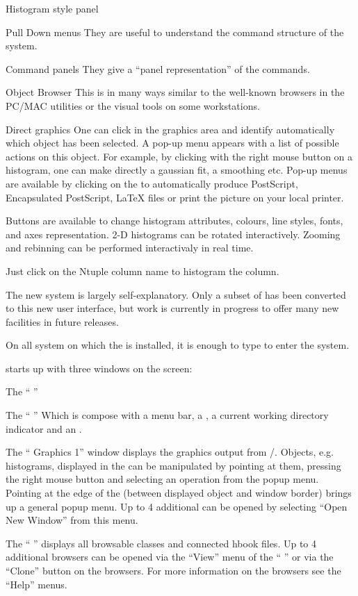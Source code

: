 \begin{DL}{Histogram style panel}
\item[Pull Down menus] They are useful to understand the command structure of
      the \XPAW{} system.
\item[Command panels] They give a ``panel representation'' of the commands.
\item[Object Browser] This is in many ways similar to the well-known browsers
      in the PC/MAC utilities or the visual tools on some workstations.
\item[Direct graphics] One can click in the graphics area and identify
      automatically which object has been selected. A pop-up menu appears
      with a list of possible actions on this object. For example, by clicking
      with the right mouse button on a histogram, one can make directly a
      gaussian fit, a smoothing etc.
      Pop-up menus are available by clicking on the \GW{} to
      automatically produce PostScript, Encapsulated PostScript, \LaTeX{} files
      or print the picture on your local printer.
\item[\HSP] Buttons are available to change
      histogram attributes, colours, line styles, fonts, and
      axes representation.
      2-D histograms can be rotated interactively. Zooming and rebinning can
      be performed interactivaly in real time.
\item[\NV] Just click on the Ntuple column name to histogram
      the column.
\end{DL}

The new system is largely self-explanatory. Only a subset of \XPAW{} has been
converted to this new user interface, but work is currently in progress to
offer many new facilities in future releases.

On all system on which the \CERNLIB{} is installed, it is enough to
type  to enter the system.

\PAWPP{} starts up with three windows on the screen:

\begin{DL}{The ``\PAWPP{} \EW''}
\item[The ``\PAWPP{} \EW'']
   Which is compose with a menu bar, a \TP, a current working
   directory indicator and an \IP.

\item[The ``\PAWPP{} Graphics 1'']
   window displays the graphics output from \HIGZ/\Xxi.
   Objects, e.g. histograms, displayed in the \GW{} can be
   manipulated by pointing at them, pressing the right mouse button and
   selecting an operation from the popup menu. Pointing at the edge of the
   \GW{} (between displayed object and window border) brings up a
   general popup menu. Up to 4 additional \GW{} can be opened by
   selecting ``Open New Window'' from this menu.

\item[The ``\PAWPP{} \MB'']
   displays all browsable classes and connected
   hbook files. Up to 4 additional browsers can be opened via the ``View'' menu
   of the ``\PAWPP{} \EW'' or via the ``Clone'' button on the
   browsers. For more information on the browsers see the ``Help'' menus.
\end{DL}

